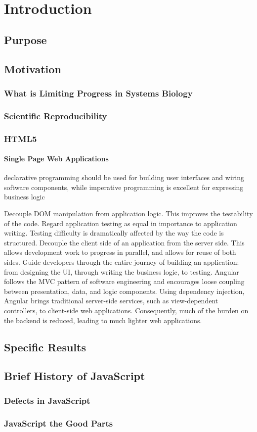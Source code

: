 \chapter{Introduction}

\section{Purpose}

\section{Motivation}

\subsection{What is Limiting Progress in Systems Biology}

\subsection{Scientific Reproducibility}

\subsection{HTML5}
\label{sec:html5}

\subsubsection{Single Page Web Applications}

declarative programming should be used for building user interfaces and wiring software components, while imperative programming is excellent for expressing business logic


Decouple DOM manipulation from application logic. This improves the testability of the code. Regard application testing as equal in importance to application writing. Testing difficulty is dramatically affected by the way the code is structured.
Decouple the client side of an application from the server side. This allows development work to progress in parallel, and allows for reuse of both sides.
Guide developers through the entire journey of building an application: from designing the UI, through writing the business logic, to testing.
Angular follows the MVC pattern of software engineering and encourages loose coupling between presentation, data, and logic components. Using dependency injection, Angular brings traditional server-side services, such as view-dependent controllers, to client-side web applications. Consequently, much of the burden on the backend is reduced, leading to much lighter web applications.
\section{Specific Results}

\section{Brief History of JavaScript}

\subsection{Defects in JavaScript}
\subsection{JavaScript the Good Parts}
